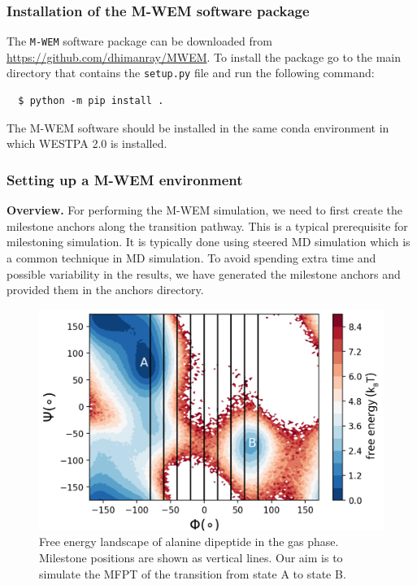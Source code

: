 \subsubsection{Installation of the M-WEM software package}

The \verb|M-WEM| software package can be downloaded from {\url{https://github.com/dhimanray/MWEM}}. 
To install the package go to the main directory that contains the \verb|setup.py| file and run the following command:

\begin{verbatim}
  $ python -m pip install .
\end{verbatim}

The M-WEM software should be installed in the same conda environment in which WESTPA 2.0 is installed.

\subsubsection{Setting up a M-WEM environment}

\textbf{Overview.} For performing the M-WEM simulation, we need to first create the milestone anchors along the transition pathway. 
This is a typical prerequisite for milestoning simulation. 
It is typically done using steered MD simulation \citep{griebel_steered_1999} which is a common technique in MD simulation. 
To avoid spending extra time and possible variability in the results, we have generated the milestone anchors and provided them in the anchors directory.

\begin{figure}[t]
\centering
\includegraphics[width=\columnwidth]{figures/Figure9_RBin.pdf}
\caption{Free energy landscape of alanine dipeptide in the gas phase. Milestone positions are shown as vertical lines. 
Our aim is to simulate the MFPT of the transition from state A to state B.}
\label{fig:ala-landscape}
\end{figure}

